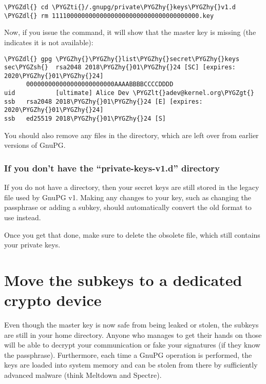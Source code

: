 \documentclass[a4paper,8pt,english]{sphinxmanual}
\def\PYGZlt{\char`\<}
\def\PYGZgt{\char`\>}
\def\PYGZsh{\char`\#}
\def\PYGZdl{\char`\$}
\def\PYGZhy{\char`\-}
\def\PYGZti{\char`\~}
\begin{document}
\begin{Verbatim}[commandchars=\\\{\}]
\PYGZdl{} cd \PYGZti{}/.gnupg/private\PYGZhy{}keys\PYGZhy{}v1.d
\PYGZdl{} rm 1111000000000000000000000000000000000000.key
\end{Verbatim}

Now, if you issue the  command, it will show that
the master key is missing (the \code{\#} indicates it is not available):

\begin{Verbatim}[commandchars=\\\{\}]
\PYGZdl{} gpg \PYGZhy{}\PYGZhy{}list\PYGZhy{}secret\PYGZhy{}keys
sec\PYGZsh{}  rsa2048 2018\PYGZhy{}01\PYGZhy{}24 [SC] [expires: 2020\PYGZhy{}01\PYGZhy{}24]
      000000000000000000000000AAAABBBBCCCCDDDD
uid           [ultimate] Alice Dev \PYGZlt{}adev@kernel.org\PYGZgt{}
ssb   rsa2048 2018\PYGZhy{}01\PYGZhy{}24 [E] [expires: 2020\PYGZhy{}01\PYGZhy{}24]
ssb   ed25519 2018\PYGZhy{}01\PYGZhy{}24 [S]
\end{Verbatim}

You should also remove any  files in the 
directory, which are left over from earlier versions of GnuPG.


\subsubsection{If you don't have the ``private-keys-v1.d'' directory}
\label{process/maintainer-pgp-guide:if-you-don-t-have-the-private-keys-v1-d-directory}
If you do not have a  directory, then your
secret keys are still stored in the legacy  file used by
GnuPG v1. Making any changes to your key, such as changing the
passphrase or adding a subkey, should automatically convert the old
 format to use  instead.

Once you get that done, make sure to delete the obsolete 
file, which still contains your private keys.


\section{Move the subkeys to a dedicated crypto device}
\label{process/maintainer-pgp-guide:smartcards}\label{process/maintainer-pgp-guide:move-the-subkeys-to-a-dedicated-crypto-device}
Even though the master key is now safe from being leaked or stolen, the
subkeys are still in your home directory. Anyone who manages to get
their hands on those will be able to decrypt your communication or fake
your signatures (if they know the passphrase). Furthermore, each time a
GnuPG operation is performed, the keys are loaded into system memory and
can be stolen from there by sufficiently advanced malware (think
Meltdown and Spectre).
\end{document}
